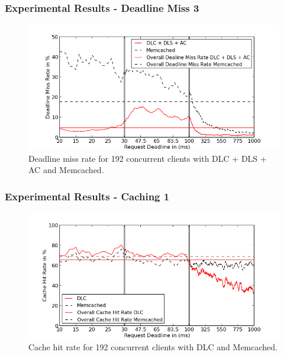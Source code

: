 \documentclass{beamer}
\begin{document}
\begin{frame}
\frametitle{Experimental Results - Deadline Miss 3}
\begin{figure}[t]
\begin{center}
\centerline{\includegraphics[scale=0.5]{img/EC2/EC2_AC_MM/miss_48.png}}
\caption{Deadline miss rate for 192 concurrent clients with DLC + DLS + AC and Memcached.}
\label{fig:miss_192_ac_mm}
\end{center}
\end{figure}
\end{frame}

\begin{frame}
\frametitle{Experimental Results - Caching 1}
\begin{figure}[t]
\begin{center}
\centerline{\includegraphics[scale=0.5]{img/EC2/EC2_CS_MM/cache_48.png}}
\caption{Cache hit rate for 192 concurrent clients with DLC and Memcached.}
\label{fig:cache_192_cs_mm}
\end{center}
\end{figure}
\end{frame}
\end{document}
